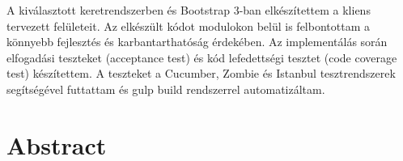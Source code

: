 A kiválasztott keretrendszerben és Bootstrap 3-ban elkészítettem a kliens tervezett felületeit. Az elkészült kódot modulokon belül is felbontottam a könnyebb fejlesztés és karbantarthatóság érdekében. Az implementálás során elfogadási teszteket (acceptance test) és kód lefedettségi tesztet (code coverage test) készítettem. A teszteket a Cucumber, Zombie és Istanbul tesztrendszerek segítségével futtattam és gulp build rendszerrel automatizáltam.



\vfill
{}
\englishParagraph


\chapter*{Abstract}



\vfill
\dolgozatnyelve
{}

\setcounter{romanPage}{\value{page}}
